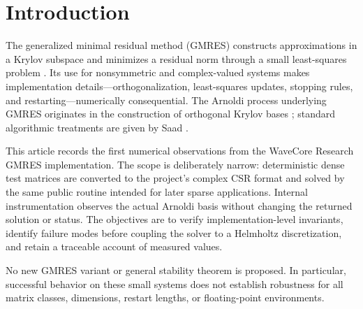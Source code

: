 \section{Introduction}

The generalized minimal residual method (GMRES) constructs approximations in a
Krylov subspace and minimizes a residual norm through a small least-squares
problem \cite{saad_schultz_1986}. Its use for nonsymmetric and complex-valued
systems makes implementation details---orthogonalization, least-squares updates,
stopping rules, and restarting---numerically consequential. The Arnoldi process
underlying GMRES originates in the construction of orthogonal Krylov bases
\cite{arnoldi_1951}; standard algorithmic treatments are given by
Saad \cite{saad_2003}.

This article records the first numerical observations from the WaveCore Research
GMRES implementation. The scope is deliberately narrow: deterministic dense test
matrices are converted to the project's complex CSR format and solved by the same
public routine intended for later sparse applications. Internal instrumentation
observes the actual Arnoldi basis without changing the returned solution or
status. The objectives are to verify implementation-level invariants, identify
failure modes before coupling the solver to a Helmholtz discretization, and retain
a traceable account of measured values.

No new GMRES variant or general stability theorem is proposed. In particular,
successful behavior on these small systems does not establish robustness for all
matrix classes, dimensions, restart lengths, or floating-point environments.
